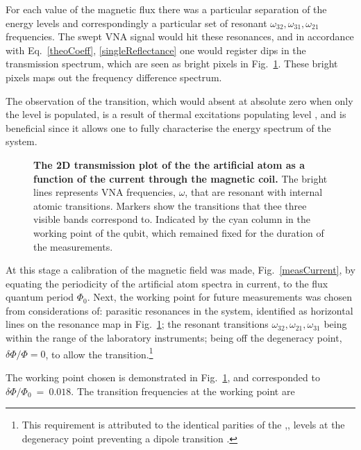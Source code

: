   For each value of the magnetic flux there was a particular separation of the energy levels and correspondingly a particular set of resonant $ \omega_{32}, \omega_{31}, \omega_{21} $ frequencies. The swept VNA signal would hit these resonances, and in accordance with Eq.~\eqref{theoCoeff}, \eqref{singleReflectance} one would register dips in the transmission spectrum, which are seen as bright pixels in Fig.~\ref{measFull}. These bright pixels maps out the frequency difference spectrum.
  
  The observation of the \lra{} transition, which would absent at absolute zero when only the  level is populated, is a result of thermal excitations populating level , and is beneficial since it allows one to fully characterise the energy spectrum of the system. 
  
  \begin{figure}
	  \caption{\small\textbf{The 2D transmission plot of the the artificial atom as a function of the current through the magnetic coil.} The bright lines represents VNA frequencies, $ \omega $, that are resonant with internal atomic transitions. Markers show the transitions that thee three visible bands correspond to. Indicated by the cyan column in the working point of the qubit, which remained fixed for the duration of the measurements.}
	  \label{measFull}
  \end{figure}
  
  At this stage a calibration of the magnetic field was made, Fig.~\ref{measCurrent}, by equating the periodicity of the artificial atom spectra in current, to the flux quantum period $ \Phi_0 $. Next, the working point for future measurements was chosen from considerations of: parasitic resonances in the system, identified as horizontal lines on the resonance map in Fig.~\ref{measFull}; the resonant transitions $ \omega_{32}, \omega_{21}, \omega_{31} $ being within the  range of the laboratory instruments; being off the degeneracy point, $ \delta\Phi/\Phi=0 $, to allow the \lra{} transition.\footnote{This requirement is attributed to the identical parities of the ,, levels at the degeneracy point preventing a dipole transition \cite{Atomicphysicsandquantumoptics}.}
  
  The working point chosen is demonstrated in Fig.~\ref{measFull}, and corresponded to $ \delta\Phi/\Phi_0~=~0.018$. The transition frequencies at the working point are
  
